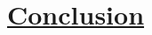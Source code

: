 \documentclass[12pt]{article} %
\numberwithin{equation}{section} %
\begin{document}



\section[Conclusion]{\hyperlink{toc}{Conclusion}}


\appendix

%


\newpage

\printindex



\end{document}
